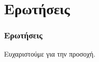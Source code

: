 \section{Ερωτήσεις}
\begin{frame}
	\frametitle{Ερωτήσεις}
	\centering
	\Huge Ευχαριστούμε για την προσοχή.
\end{frame}
